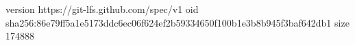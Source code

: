 version https://git-lfs.github.com/spec/v1
oid sha256:86e79ff5a1e5173ddc6ec06f624ef2b59334650f100b1e3b8b945f3baf642db1
size 174888
